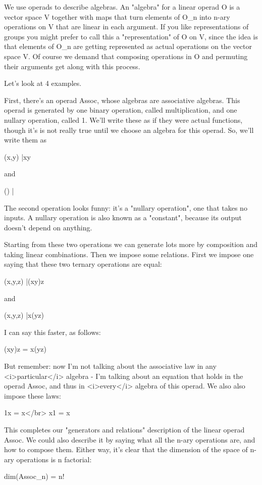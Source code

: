 We use operads to describe algebras.  An "algebra" for a
linear operad O is a vector space V together with maps that turn
elements of O_{n} into n-ary operations on V that are linear
in each argument.  If you like representations of groups you might
prefer to call this a "representation" of O on V, since the
idea is that elements of O_{n} are getting represented as
actual operations on the vector space V.  Of course we demand that
composing operations in O and permuting their arguments get along with
this process.

Let's look at 4 examples.

First, there's an operad Assoc, whose algebras are associative
algebras.  This operad is generated by one binary operation, called
multiplication, and one nullary operation, called 1.  We'll write
these as if they were actual functions, though it's is not really true
until we choose an algebra for this operad.  So, we'll write them as

(x,y) |\to  xy

and

() |

The second operation looks funny: it's a "nullary
operation", one that takes no inputs.  A nullary operation is
also known as a "constant", because its output doesn't
depend on anything.

Starting from these two operations we can generate lots more by
composition and taking linear combinations.  Then we impose some
relations.  First we impose one saying that these two ternary
operations are equal:

(x,y,z) |\to  (xy)z

and

(x,y,z) |\to  x(yz)

I can say this faster, as follows:

(xy)z = x(yz)

But remember: now I'm not talking about the associative law in any
<i>particular</i> algebra - I'm talking about an equation that holds
in the operad Assoc, and thus in <i>every</i> algebra of this operad.
We also also impose these laws:

1x = x</br>
x1 = x

This completes our "generators and relations" description of
the linear operad Assoc.  We could also describe it by saying what all
the n-ary operations are, and how to compose them.  Either way, it's
clear that the dimension of the space of n-ary operations is n
factorial:

dim(Assoc_{n}) = n!

